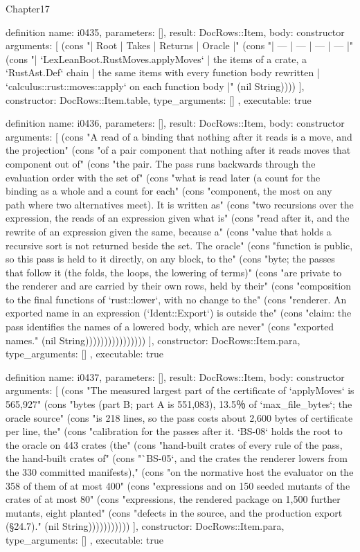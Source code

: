 \begin{lexlean}{Chapter17}
\begin{semanticmodule}
definition{
  name: i0435,
  parameters: [],
  result: DocRows::Item,
  body: constructor{
    arguments: [
      (cons "| Root | Takes | Returns | Oracle |" (cons "| --- | --- | --- | --- |" (cons "| `LexLeanBoot.RustMoves.applyMoves` | the items of a crate, a `RustAst.Def` chain | the same items with every function body rewritten | `calculus::rust::moves::apply` on each function body |" (nil String))))
    ],
    constructor: DocRows::Item.table,
    type_arguments: []
  },
  executable: true
}

definition{
  name: i0436,
  parameters: [],
  result: DocRows::Item,
  body: constructor{
    arguments: [
      (cons "A read of a binding that nothing after it reads is a move, and the projection" (cons "of a pair component that nothing after it reads moves that component out of" (cons "the pair. The pass runs backwards through the evaluation order with the set of" (cons "what is read later (a count for the binding as a whole and a count for each" (cons "component, the most on any path where two alternatives meet). It is written as" (cons "two recursions over the expression, the reads of an expression given what is" (cons "read after it, and the rewrite of an expression given the same, because a" (cons "value that holds a recursive sort is not returned beside the set. The oracle" (cons "function is public, so this pass is held to it directly, on any block, to the" (cons "byte; the passes that follow it (the folds, the loops, the lowering of terms)" (cons "are private to the renderer and are carried by their own rows, held by their" (cons "composition to the final functions of `rust::lower`, with no change to the" (cons "renderer. An exported name in an expression (`Ident::Export`) is outside the" (cons "claim: the pass identifies the names of a lowered body, which are never" (cons "exported names." (nil String))))))))))))))))
    ],
    constructor: DocRows::Item.para,
    type_arguments: []
  },
  executable: true
}

definition{
  name: i0437,
  parameters: [],
  result: DocRows::Item,
  body: constructor{
    arguments: [
      (cons "The measured largest part of the certificate of `applyMoves` is 565,927" (cons "bytes (part B; part A is 551,083), 13.5％ of `max_file_bytes`; the oracle source" (cons "is 218 lines, so the pass costs about 2,600 bytes of certificate per line, the" (cons "calibration for the passes after it. `BS-08` holds the root to the oracle on 443 crates (the" (cons "hand-built crates of every rule of the pass, the hand-built crates of" (cons "`BS-05`, and the crates the renderer lowers from the 330 committed manifests)," (cons "on the normative host the evaluator on the 358 of them of at most 400" (cons "expressions and on 150 seeded mutants of the crates of at most 80" (cons "expressions, the rendered package on 1,500 further mutants, eight planted" (cons "defects in the source, and the production export (§24.7)." (nil String)))))))))))
    ],
    constructor: DocRows::Item.para,
    type_arguments: []
  },
  executable: true
}


\end{semanticmodule}
\end{lexlean}
